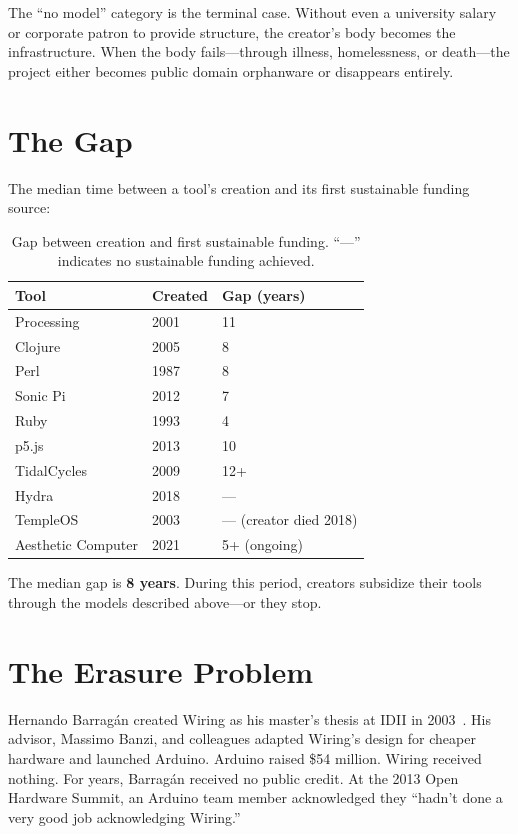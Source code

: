 \documentclass[10pt,letterpaper,twocolumn]{article}
\begin{document}
The ``no model'' category is the terminal case. Without even a university salary or corporate patron to provide structure, the creator's body becomes the infrastructure. When the body fails---through illness, homelessness, or death---the project either becomes public domain orphanware or disappears entirely.

\section{The Gap}

The median time between a tool's creation and its first sustainable funding source:

\begin{table}[h]
\small
\centering
\begin{tabularx}{\linewidth}{XXX}
\toprule
\textbf{Tool} & \textbf{Created} & \textbf{Gap (years)} \\
\midrule
Processing & 2001 & 11 \\
Clojure & 2005 & 8 \\
Perl & 1987 & 8 \\
Sonic Pi & 2012 & 7 \\
Ruby & 1993 & 4 \\
p5.js & 2013 & 10 \\
TidalCycles & 2009 & 12+ \\
Hydra & 2018 & --- \\
TempleOS & 2003 & --- (creator died 2018) \\
Aesthetic Computer & 2021 & 5+ (ongoing) \\
\bottomrule
\end{tabularx}
\caption{Gap between creation and first sustainable funding. ``---'' indicates no sustainable funding achieved.}
\label{tab:gap}
\end{table}

The median gap is \textbf{8 years}. During this period, creators subsidize their tools through the models described above---or they stop.

\section{The Erasure Problem}

Hernando Barrag\'an created Wiring as his master's thesis at IDII in 2003~\citep{barragan2004wiring}. His advisor, Massimo Banzi, and colleagues adapted Wiring's design for cheaper hardware and launched Arduino. Arduino raised \$54 million. Wiring received nothing. For years, Barrag\'an received no public credit. At the 2013 Open Hardware Summit, an Arduino team member acknowledged they ``hadn't done a very good job acknowledging Wiring.''
\end{document}
